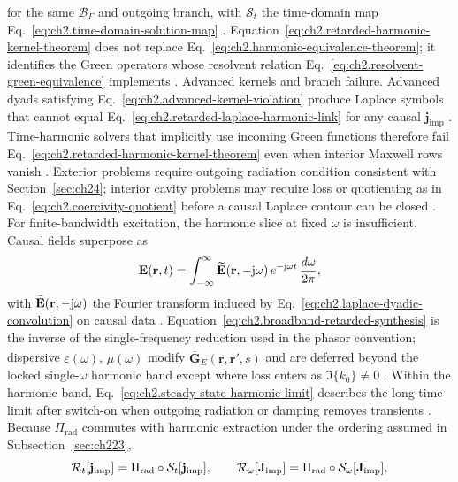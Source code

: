 for the same \(\mathcal{B}_\Gamma\) and outgoing branch, with \(\mathcal{S}_t\) the
time-domain map Eq.~\eqref{eq:ch2.time-domain-solution-map} \cite{stratton1941}.
Equation~\eqref{eq:ch2.retarded-harmonic-kernel-theorem} does not replace
Eq.~\eqref{eq:ch2.harmonic-equivalence-theorem}; it identifies the Green operators
whose resolvent relation Eq.~\eqref{eq:ch2.resolvent-green-equivalence} implements
\cite{harrington2001}.
Advanced kernels and branch failure. Advanced dyads satisfying Eq.~\eqref{eq:ch2.advanced-kernel-violation} produce
Laplace symbols that cannot equal
Eq.~\eqref{eq:ch2.retarded-laplace-harmonic-link} for any causal
\(\mathbf{j}_{\mathrm{imp}}\) \cite{stratton1941}. Time-harmonic solvers that
implicitly use incoming Green functions therefore fail
Eq.~\eqref{eq:ch2.retarded-harmonic-kernel-theorem} even when interior Maxwell rows
vanish \cite{harrington2001}. Exterior problems require outgoing radiation condition consistent
with Section~\ref{sec:ch24}; interior cavity problems may require loss or quotienting
as in Eq.~\eqref{eq:ch2.coercivity-quotient} before a causal Laplace contour can be
closed \cite{stratton1941}. For finite-bandwidth excitation, the harmonic slice at fixed \(\omega\) is insufficient.
Causal fields superpose as
\begin{equation}
\label{eq:ch2.broadband-retarded-synthesis}
\mathbf{E}(\mathbf{r},t)
=
\int_{-\infty}^{\infty}
\widetilde{\mathbf{E}}(\mathbf{r},-\mathrm{j}\omega)\,e^{-\mathrm{j}\omega t}\,\frac{d\omega}{2\pi},
\end{equation}
with \(\widetilde{\mathbf{E}}(\mathbf{r},-\mathrm{j}\omega)\) the Fourier transform induced by
Eq.~\eqref{eq:ch2.laplace-dyadic-convolution} on causal data
\cite{stratton1941}. Equation~\eqref{eq:ch2.broadband-retarded-synthesis}
is the inverse of the single-frequency reduction used in the phasor convention; dispersive
\(\varepsilon(\omega)\), \(\mu(\omega)\) modify
\(\widetilde{\overline{\mathbf{G}}}_{E}(\mathbf{r},\mathbf{r}',s)\) and are deferred
beyond the locked single-\(\omega\) harmonic band except where loss enters as
\(\Im\{k_0\}\neq 0\) \cite{harrington2001}. Within the harmonic band,
Eq.~\eqref{eq:ch2.steady-state-harmonic-limit} describes the long-time limit after
switch-on when outgoing radiation or damping removes transients
\cite{stratton1941}.
Because \(\Pi_{\mathrm{rad}}\) commutes with harmonic extraction under the ordering
assumed in Subsection~\ref{sec:ch223},
\begin{equation}
\label{eq:ch2.retarded-radiation-kernel-composition}
\mathcal{R}_t[\mathbf{j}_{\mathrm{imp}}]
=
\Pi_{\mathrm{rad}}\circ\mathcal{S}_t[\mathbf{j}_{\mathrm{imp}}],
\qquad
\mathcal{R}_\omega[\mathbf{J}_{\mathrm{imp}}]
=
\Pi_{\mathrm{rad}}\circ\mathcal{S}_\omega[\mathbf{J}_{\mathrm{imp}}],
\end{equation}
